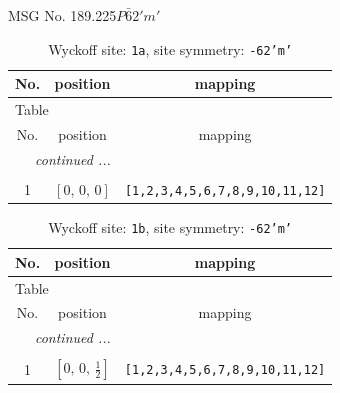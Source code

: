 \documentclass[fleqn,8pt]{jsarticle}
\begin{document}
\setcounter{MaxMatrixCols}{32}

\renewcommand{\tablename}{Table~}
\renewcommand{\figurename}{Figure~}
\begin{center}
\LARGE
MSG No. 189.225\quad$P\bar{6}2'm'$
\end{center}
\renewcommand{\arraystretch}{1.2}
\begin{longtable}{ccc}
\caption{Wyckoff site: {\tt 1a}, site symmetry: {\tt -62'm'}}
 \\
 \hline \hline
No. & position & mapping \\ \hline \endfirsthead

\multicolumn{2}{l}{\tablename\ \thetable{}} \\
 \hline \hline
No. & position & mapping \\ \hline \endhead

 \hline \hline
\multicolumn{2}{r}{\footnotesize\it continued ...} \\ \endfoot

 \hline \hline
\multicolumn{2}{r}{} \\ \endlastfoot

1 & $\left[ 0,\, 0,\, 0 \right]$ & {\tt [1,2,3,4,5,6,7,8,9,10,11,12]} \\
\end{longtable}
\renewcommand{\arraystretch}{1.2}
\begin{longtable}{ccc}
\caption{Wyckoff site: {\tt 1b}, site symmetry: {\tt -62'm'}}
 \\
 \hline \hline
No. & position & mapping \\ \hline \endfirsthead

\multicolumn{2}{l}{\tablename\ \thetable{}} \\
 \hline \hline
No. & position & mapping \\ \hline \endhead

 \hline \hline
\multicolumn{2}{r}{\footnotesize\it continued ...} \\ \endfoot

 \hline \hline
\multicolumn{2}{r}{} \\ \endlastfoot

1 & $\left[ 0,\, 0,\, \frac{1}{2} \right]$ & {\tt [1,2,3,4,5,6,7,8,9,10,11,12]} \\
\end{longtable}
\renewcommand{\arraystretch}{1.2}
\end{document}
